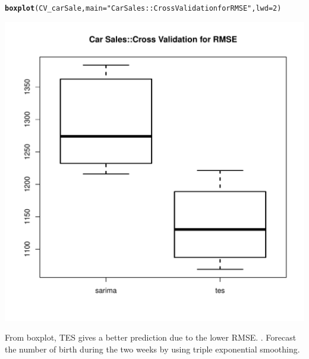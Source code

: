 \documentclass[10pt]{article}\usepackage[]{graphicx}\usepackage[]{color}
\makeatletter
\def\maxwidth{ %
  \ifdim\Gin@nat@width>\linewidth
    \linewidth
  \else
    \Gin@nat@width
  \fi
}
\newcommand{\hlnum}[1]{\textcolor[rgb]{0.686,0.059,0.569}{#1}}%
\newcommand{\hlstr}[1]{\textcolor[rgb]{0.192,0.494,0.8}{#1}}%
\newcommand{\hlstd}[1]{\textcolor[rgb]{0.345,0.345,0.345}{#1}}%
\newcommand{\hlkwc}[1]{\textcolor[rgb]{0.333,0.667,0.333}{#1}}%
\newcommand{\hlkwd}[1]{\textcolor[rgb]{0.737,0.353,0.396}{\textbf{#1}}}%
\newenvironment{kframe}{%
 \def\at@end@of@kframe{}%
 \ifinner\ifhmode%
  \def\at@end@of@kframe{\end{minipage}}%
  \begin{minipage}{\columnwidth}%
 \fi\fi%
 \def\FrameCommand##1{\hskip\@totalleftmargin \hskip-\fboxsep
 \colorbox{shadecolor}{##1}\hskip-\fboxsep
     \hskip-\linewidth \hskip-\@totalleftmargin \hskip\columnwidth}%
 \MakeFramed {\advance\hsize-\width
   \@totalleftmargin\z@ \linewidth\hsize
   \@setminipage}}%
 {\par\unskip\endMakeFramed%
 \at@end@of@kframe}
\newenvironment{knitrout}{}{} %
\makeatother
\begin{document}
\begin{knitrout}
\begin{kframe}
\begin{alltt}
\hlkwd{boxplot}\hlstd{(CV_carSale,}\hlkwc{main} \hlstd{=} \hlstr{"Car Sales::Cross Validation for RMSE"}\hlstd{,} \hlkwc{lwd}\hlstd{=}\hlnum{2}\hlstd{)}
\end{alltt}
\end{kframe}
\includegraphics[width=\maxwidth]{figure/unnamed-chunk-38-1} 

\end{knitrout}
From boxplot, TES gives a better prediction due to the lower RMSE.
. Forecast the number of birth during the two weeks by using triple exponential smoothing.
\end{document}
